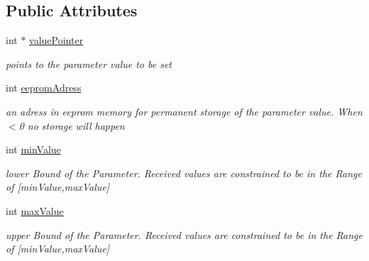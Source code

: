 \subsection*{Public Attributes}
\begin{DoxyCompactItemize}
\item 
\hypertarget{class_int_parameter_setting_a1aa7b8fb26fedb2fc1d6a2aa16939242}{int $\ast$ \hyperlink{class_int_parameter_setting_a1aa7b8fb26fedb2fc1d6a2aa16939242}{value\-Pointer}}\label{class_int_parameter_setting_a1aa7b8fb26fedb2fc1d6a2aa16939242}

\begin{DoxyCompactList}\small\item\em points to the parameter value to be set \end{DoxyCompactList}\item 
\hypertarget{class_int_parameter_setting_abc7b6763da86459663dfe0cadc40b987}{int \hyperlink{class_int_parameter_setting_abc7b6763da86459663dfe0cadc40b987}{eeprom\-Adress}}\label{class_int_parameter_setting_abc7b6763da86459663dfe0cadc40b987}

\begin{DoxyCompactList}\small\item\em an adress in eeprom memory for permanent storage of the parameter value. When $<$0 no storage will happen \end{DoxyCompactList}\item 
\hypertarget{class_int_parameter_setting_a182af9fe700c0dd905706d0f1d2f6b4c}{int \hyperlink{class_int_parameter_setting_a182af9fe700c0dd905706d0f1d2f6b4c}{min\-Value}}\label{class_int_parameter_setting_a182af9fe700c0dd905706d0f1d2f6b4c}

\begin{DoxyCompactList}\small\item\em lower Bound of the Parameter. Received values are constrained to be in the Range of \mbox{[}min\-Value,max\-Value\mbox{]} \end{DoxyCompactList}\item 
\hypertarget{class_int_parameter_setting_a8c60a809a280a808cb792cab9b2b29ff}{int \hyperlink{class_int_parameter_setting_a8c60a809a280a808cb792cab9b2b29ff}{max\-Value}}\label{class_int_parameter_setting_a8c60a809a280a808cb792cab9b2b29ff}

\begin{DoxyCompactList}\small\item\em upper Bound of the Parameter. Received values are constrained to be in the Range of \mbox{[}min\-Value,max\-Value\mbox{]} \end{DoxyCompactList}\end{DoxyCompactItemize}


